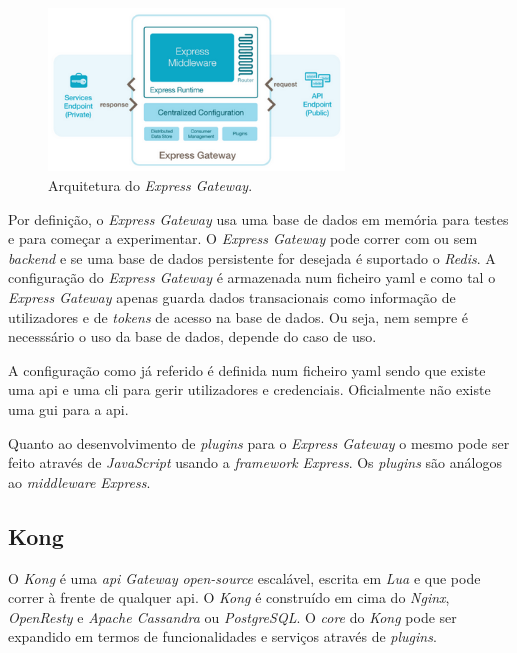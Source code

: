 \begin{figure}[H]
    \begin{center}
        \includegraphics[width=0.7\textwidth]{img/expressGatArch.png}
    \end{center}
    \caption{Arquitetura do \textit{Express Gateway}.~\cite{kongArch}}
\end{figure}

Por definição, o \textit{Express Gateway} usa uma base de dados em memória para testes e para começar a experimentar. O \textit{Express Gateway} pode correr com ou sem \textit{backend} e se uma base de dados persistente for desejada é suportado o \textit{Redis}. A configuração do \textit{Express Gateway} é armazenada num ficheiro \acrshort{yaml} e como tal o \textit{Express Gateway} apenas guarda dados transacionais como informação de utilizadores e de \textit{tokens} de acesso na base de dados. Ou seja, nem sempre é necesssário o uso da base de dados, depende do caso de uso.

A configuração como já referido é definida num ficheiro \acrshort{yaml} sendo que existe uma \acrshort{api} e uma \acrshort{cli} para gerir utilizadores e credenciais. Oficialmente não existe uma \acrshort{gui} para a \acrshort{api}.

Quanto ao desenvolvimento de \textit{plugins} para o \textit{Express Gateway} o mesmo pode ser feito através de \textit{JavaScript} usando a \textit{framework} \textit{Express}. Os \textit{plugins} são análogos ao \textit{middleware} \textit{Express}. 

\subsection{Kong}

O \textit{Kong} é uma \textit{\acrshort{api} Gateway} \textit{open-source} escalável, escrita em \textit{Lua} e que pode correr à frente de qualquer \acrshort{api}. O \textit{Kong} é construído em cima do \textit{Nginx}, \textit{OpenResty} e \textit{Apache Cassandra} ou \textit{PostgreSQL}. O \textit{core} do \textit{Kong} pode ser expandido em termos de funcionalidades e serviços através de \textit{plugins}.

